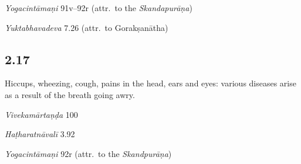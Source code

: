 \begin{ekdosis}
\begin{testimonia}[hp02_016]
\emph{Yogacintāmaṇi} 91v–92r (attr.~to the \emph{Skandapurāṇa})

\begin{versinnote}
\end{versinnote}

\emph{Yuktabhavadeva} 7.26 (attr.~to Gorakṣanātha)
\begin{versinnote}
\end{versinnote}
\end{testimonia}


\subsection*{2.17}
\begin{translation}[hp02_017]
Hiccups, wheezing, cough, pains in the head, ears and eyes: various diseases arise as a result of the breath going awry.
\end{translation}

\begin{sources}[hp02_017]
\emph{Vivekamārtaṇḍa} 100

\begin{versinnote}
\end{versinnote}
\end{sources}

\begin{testimonia}[hp02_017]
\emph{Haṭharatnāvalī} 3.92

\begin{versinnote}
\end{versinnote}

\emph{Yogacintāmaṇi} 92r (attr.~to the \emph{Skandpurāṇa})


\end{testimonia}
\end{ekdosis}
